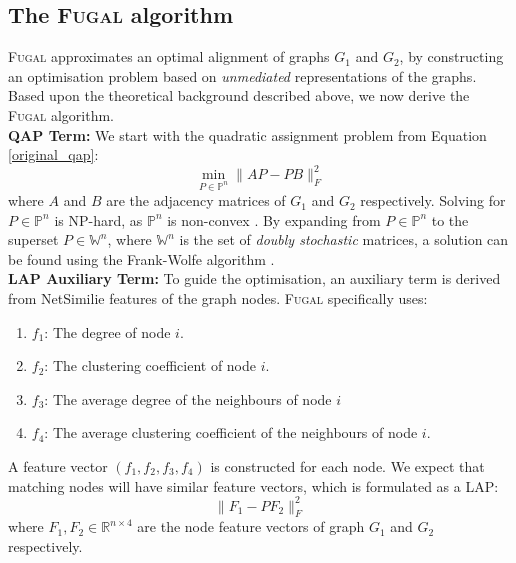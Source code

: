 \subsection{The \textsc{Fugal} algorithm}
\textsc{Fugal} approximates an optimal alignment of graphs $G_1$ and $G_2$, by constructing an optimisation problem based on \textit{unmediated} representations of the graphs. Based upon the theoretical background described above, we now derive the \textsc{Fugal} algorithm.\\

\noindent
\textbf{QAP Term:} We start with the quadratic assignment problem from Equation \ref{original_qap}:
\begin{equation}
    \min_{P \in \mathds{P}^n} \lVert AP-PB \rVert^2_F
\end{equation} 
where $A$ and $B$ are the adjacency matrices of $G_1$ and $G_2$ respectively. Solving for $P \in \mathds{P}^n$ is NP-hard, as $\mathds{P}^n$ is non-convex \citep{koopmans1957assignment}. By expanding from $P \in \mathds{P}^n$ to the superset $P \in \mathds{W}^n$, where $\mathds{W}^n$ is the set of \textit{doubly stochastic} matrices, a solution can be found using the Frank-Wolfe algorithm \citep{frank1956algorithm}.\\

\noindent
\textbf{LAP Auxiliary Term:} To guide the optimisation, an auxiliary term is derived from NetSimilie \citep{berlingerio2013network} features of the graph nodes. \textsc{Fugal} specifically uses:
\begin{enumerate}
    \item $f_1$: The degree of node $i$.
    \item $f_2$: The clustering coefficient of node $i$.
    \item $f_3$: The average degree of the neighbours of node $i$
    \item $f_4$: The average clustering coefficient of the neighbours of node $i$.
\end{enumerate}

A feature vector $(f_1, f_2, f_3, f_4)$ is constructed for each node. We expect that matching nodes will have similar feature vectors, which is formulated as a LAP:
\begin{equation}
    \lVert F_1 - P F_2 \rVert^2_F 
\end{equation}
where $F_1, F_2 \in \mathds{R}^{n \times 4}$ are the node feature vectors of graph $G_1$ and $G_2$ respectively.\\

